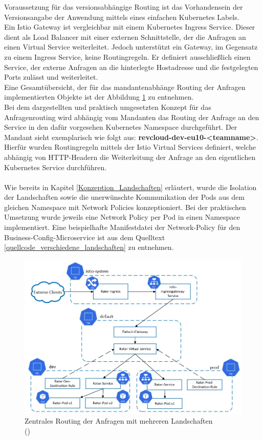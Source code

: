 Voraussetzung für das versionsabhängige Routing ist das Vorhandensein der Versionsangabe der Anwendung mittels eines einfachen Kubernetes Labels.\\
Ein Istio Gateway ist vergleichbar mit einem Kubernetes Ingress Service. Dieser dient als Load Balancer mit einer externen Schnittstelle, der die Anfragen an einen Virtual Service weiterleitet. Jedoch unterstützt ein Gateway, im Gegensatz zu einem Ingress Service, keine Routingregeln. Er definiert ausschließlich einen Service, der externe Anfragen an die hinterlegte Hostadresse und die festgelegten Ports zulässt und weiterleitet.\autocite[Vgl.][]{IstioAuthors.2019}\\
Eine Gesamtübersicht, der für das mandantenabhänge Routing der Anfragen implementierten Objekte ist der Abbildung \ref{picture_request_routing} zu entnehmen.
\\
Bei dem dargestellten und praktisch umgesetzten Konzept für das Anfragenrouting wird abhängig vom Mandanten das Routing der Anfrage an den Service in den dafür vorgesehen Kubernetes Namespace durchgeführt. Der Mandant sieht exemplarisch wie folgt aus: \textbf{revcloud-dev-eu10-<teamname>}. Hierfür wurden Routingregeln mittels der Istio Virtual Services definiert, welche abhängig von \ac{HTTP}-Headern die Weiterleitung der Anfrage an den eigentlichen Kubernetes Service durchführen.\\
\\
Wie bereits in Kapitel \ref{Konzeption_Landschaften} erläutert, wurde die Isolation der Landschaften sowie die unerwünschte Kommunikation der Pods aus dem gleichen Namespace mit Network Policies konzeptioniert.
Bei der praktischen Umsetzung wurde jeweils eine Network Policy per Pod in einen Namespace implementiert. Eine beispielhafte Manifestdatei der Network-Policy für den Business-Config-Microservice ist aus dem Quelltext \ref{quellcode_verschiedene_landschaften} zu entnehmen.
\begin{figure}[h]
	\begin{center}
		\includegraphics[width=16cm]{img/Landscape_Routing.JPG}
		\caption[Zentrales Routing der Anfragen mit mehreren Landschaften]{Zentrales Routing der Anfragen mit mehreren Landschaften \\(\cite[Eigene Abbildung in Anlehnung an][S. 170]{Sharma.2020})}
		\label{picture_request_routing}
	\end{center}
\end{figure}
